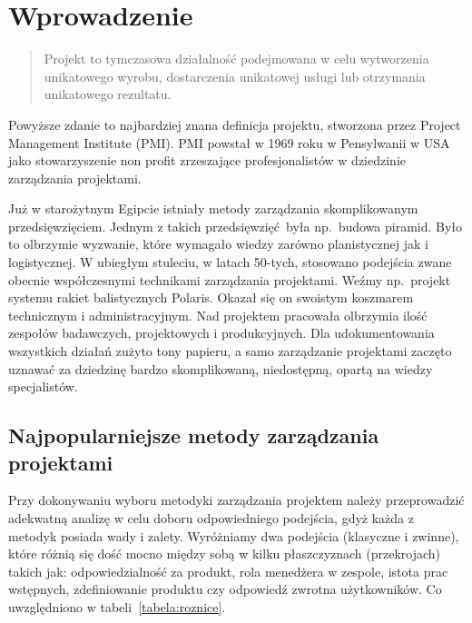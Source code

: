 ﻿%

\chapter{Wprowadzenie}

\begin{quote}
Projekt to tymczasowa działalność podejmowana w celu wytworzenia unikatowego wyrobu,
dostarczenia unikatowej usługi lub otrzymania unikatowego rezultatu.
~\cite{PMI_2000}
\end{quote}

Powyższe zdanie to najbardziej znana definicja projektu, stworzona przez
Project Management Institute (PMI).
PMI powstał w 1969 roku w Pensylwanii w USA jako stowarzyszenie non profit
zrzeszające profesjonalistów w dziedzinie zarządzania projektami.

Już w starożytnym Egipcie istniały metody zarządzania skomplikowanym przedsięwzięciem.
Jednym z takich przedsięwzięć była np.\ budowa piramid.
Było to olbrzymie wyzwanie, które wymagało wiedzy zarówno planistycznej jak i logistycznej.
W ubiegłym stuleciu, w latach 50-tych, stosowano podejścia zwane obecnie współczesnymi
technikami zarządzania projektami. Weźmy np.\ projekt systemu rakiet balistycznych Polaris.
Okazał się on swoistym koszmarem technicznym i administracyjnym.
Nad projektem pracowała olbrzymia ilość zespołów badawczych, projektowych i produkcyjnych.
Dla udokumentowania wszystkich działań zużyto tony papieru,
a samo zarządzanie projektami zaczęto uznawać za dziedzinę bardzo skomplikowaną,
niedostępną, opartą na wiedzy specjalistów.
~\cite{Stanley_2013}

\section{Najpopularniejsze metody zarządzania projektami}
Przy dokonywaniu wyboru metodyki zarządzania projektem należy przeprowadzić
adekwatną analizę w celu doboru odpowiedniego podejścia,
gdyż każda z metodyk posiada wady i zalety.
Wyróżniamy dwa podejścia (klasyczne i zwinne), które różnią się dość mocno między sobą
w kilku płaszczyznach (przekrojach) takich jak:
odpowiedzialność za produkt, rola menedżera w zespole, istota prac wstępnych,
zdefiniowanie produktu czy odpowiedź zwrotna użytkowników.
Co uwzględniono w tabeli~\ref{tabela:roznice}.

